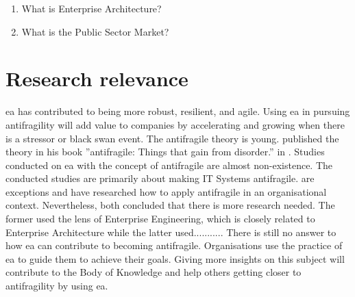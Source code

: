 \begin{enumerate}
	\item{What is Enterprise Architecture?}
	\item{What is the Public Sector Market?}
\end{enumerate}

\section{Research relevance}
\label{sec:researchrelevance}
\acrfull{ea} has contributed to being more \gls{robust}, \gls{resilient}, and \gls{agile}. Using \acrshort{ea} in pursuing \gls{antifragility} will add value to companies by accelerating and growing when there is a stressor or black swan event. The \gls{antifragile} theory is young.  \citeauthor{Taleb2012} published the theory in his book ''\Gls{antifragile}: Things that gain from disorder.'' in \citeyear{Taleb2012}.  Studies conducted on \acrshort{ea} with the concept of \gls{antifragile} are almost non-existence. The conducted studies are primarily about making IT Systems \gls{antifragile}. \textcite{Botjes2020,Kastner2017} are exceptions and have researched how to apply \gls{antifragile} in an organisational context. Nevertheless, both concluded that there is more research needed. The former used the lens of Enterprise Engineering, which is closely related to Enterprise Architecture while the latter used........... There is still no answer to how \acrshort{ea} can contribute to becoming \gls{antifragile}. Organisations use the practice of \acrshort{ea} to guide them to achieve their goals. Giving more insights on this subject will contribute to the Body of Knowledge and help others getting closer to \gls{antifragility} by using \acrshort{ea}.

